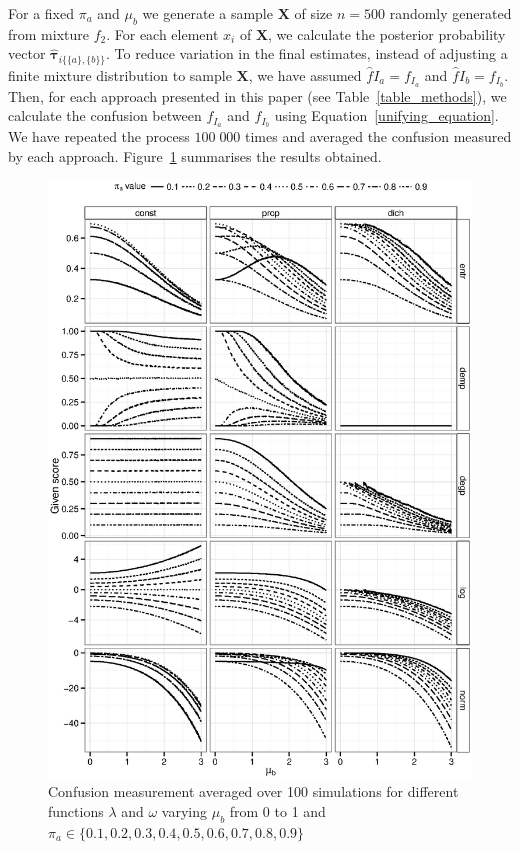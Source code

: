 \documentclass[10pt, a4paper]{article}
\newcommand{\m}[1]{\boldsymbol{#1}}
\begin{document}
\begin{spacing}{1.9}
For a fixed $\pi_a$ and $\mu_b$ we generate a sample $\m X$ of size $n=500$ randomly generated from mixture $f_2$. For each element $x_i$ of $\m X$, we calculate the posterior probability vector $\hat{\m \tau}_{i \{\{a\},\{b\}\}}$. To reduce variation in the final estimates, instead of adjusting a finite mixture distribution to  sample $\m X$, we have assumed $\hat{f}{I_a} = f_{I_a}$ and $\hat{f}{I_b} = f_{I_b}$. Then, for each approach presented in this paper (see  Table~\ref{table_methods}), we calculate the confusion between $f_{I_a}$ and $f_{I_b}$ using Equation~\ref{unifying_equation}. We have repeated the process $100\;000$ times and averaged the confusion measured by each approach. Figure~\ref{fig:mu_varying} summarises the results obtained.

\begin{figure}[!t]
\centering
\includegraphics[scale=.5]{fig01all.eps}
\caption{Confusion measurement averaged over 100 simulations for different functions $\lambda$ and $\omega$ varying $\mu_b$ from 0 to 1 and $\pi_a \in \{0.1, 0.2, 0.3, 0.4, 0.5, 0.6, 0.7, 0.8, 0.9\}$ }
\label{fig:mu_varying}
\end{figure}


\end{spacing}
\end{document}
